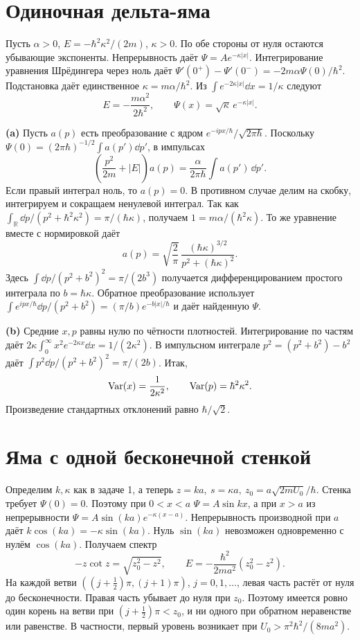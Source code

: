 \documentclass[11pt,a4paper]{article}
\begin{document}
\section{Одиночная дельта-яма}

Пусть \(\alpha>0\), \(E=-\hbar^2\kappa^2/(2m)\), \(\kappa>0\).
По обе стороны от нуля остаются убывающие экспоненты.
Непрерывность даёт \(\Psi=A e^{-\kappa|x|}\).
Интегрирование уравнения Шрёдингера через ноль даёт
\(\Psi'(0^+)-\Psi'(0^-)=-2m\alpha\Psi(0)/\hbar^2\).
Подстановка даёт единственное \(\kappa=m\alpha/\hbar^2\).
Из \(\int e^{-2\kappa|x|}\dd x=1/\kappa\) следуют
\[
 E=-\frac{m\alpha^2}{2\hbar^2},\qquad \Psi(x)=\sqrt\kappa\,e^{-\kappa|x|}.
\]

\textbf{(a)} Пусть \(a(p)\) есть преобразование с ядром
\(e^{-ipx/\hbar}/\sqrt{2\pi\hbar}\). Поскольку
\(\Psi(0)=(2\pi\hbar)^{-1/2}\int a(p')\dd p'\), в импульсах
\[
 \left(\frac{p^2}{2m}+|E|\right)a(p)=
                 \frac{\alpha}{2\pi\hbar}\int a(p')\,\dd p'.
\]
Если правый интеграл ноль, то \(a(p)=0\).
В противном случае делим на скобку, интегрируем и сокращаем
ненулевой интеграл. Так как
\(\int_\mathbb R\dd p/(p^2+\hbar^2\kappa^2)=\pi/(\hbar\kappa)\),
получаем \(1=m\alpha/(\hbar^2\kappa)\).
То же уравнение вместе с нормировкой даёт
\[
 a(p)=\sqrt{\frac{2}{\pi}}\,
              \frac{(\hbar\kappa)^{3/2}}{p^2+(\hbar\kappa)^2}.
\]
Здесь \(\int\dd p/(p^2+b^2)^2=\pi/(2b^3)\) получается
дифференцированием простого интеграла по \(b=\hbar\kappa\).
Обратное преобразование использует
\(\int e^{ipx/\hbar}\dd p/(p^2+b^2)=(\pi/b)e^{-b|x|/\hbar}\)
и даёт найденную \(\Psi\).

\textbf{(b)} Средние \(x,p\) равны нулю по чётности плотностей.
Интегрирование по частям даёт
\(2\kappa\int_0^\infty x^2e^{-2\kappa x}\dd x=1/(2\kappa^2)\).
В импульсном интеграле \(p^2=(p^2+b^2)-b^2\)
даёт \(\int p^2\dd p/(p^2+b^2)^2=\pi/(2b)\).
Итак,
\[
 \operatorname{Var}(x)=\frac{1}{2\kappa^2},\qquad \operatorname{Var}(p)=\hbar^2\kappa^2 .
\]
Произведение стандартных отклонений равно \(\hbar/\sqrt2\).

\section{Яма с одной бесконечной стенкой}

Определим \(k,\kappa\) как в задаче 1, а теперь
\(z=ka,\ s=\kappa a,\ z_0=a\sqrt{2mU_0}/\hbar\).
Стенка требует \(\Psi(0)=0\). Поэтому при \(0<x<a\)
\(\Psi=A\sin kx\), а при \(x>a\) из непрерывности
\(\Psi=A\sin(ka)e^{-\kappa(x-a)}\).
Непрерывность производной при \(a\) даёт \(k\cos(ka)=-\kappa\sin(ka)\).
Нуль \(\sin(ka)\) невозможен одновременно с нулём \(\cos(ka)\).
Получаем спектр
\[
 -z\cot z=\sqrt{z_0^2-z^2},\qquad
 E=-\frac{\hbar^2}{2ma^2}(z_0^2-z^2).
\]
На каждой ветви \(((j+\tfrac12)\pi,(j+1)\pi)\), \(j=0,1,\ldots\),
левая часть растёт от нуля до бесконечности. Правая часть убывает
до нуля при \(z_0\). Поэтому имеется ровно один корень на ветви
при \((j+\tfrac12)\pi<z_0\), и ни одного при обратном неравенстве
или равенстве. В частности, первый уровень возникает при
\(U_0>\pi^2\hbar^2/(8ma^2)\).
\end{document}
